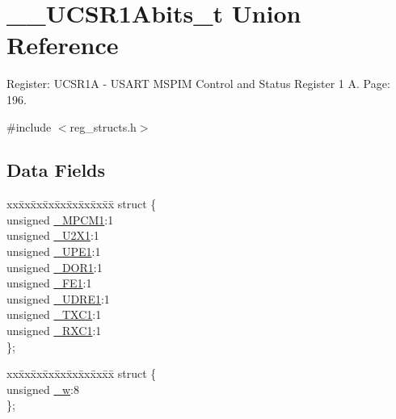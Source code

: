 \hypertarget{union_____u_c_s_r1_abits__t}{\section{\+\_\+\+\_\+\+U\+C\+S\+R1\+Abits\+\_\+t Union Reference}
\label{union_____u_c_s_r1_abits__t}
}


Register\+: U\+C\+S\+R1\+A -\/ U\+S\+A\+R\+T M\+S\+P\+I\+M Control and Status Register 1 A. Page\+: 196.  




{\ttfamily \#include $<$reg\+\_\+structs.\+h$>$}

\subsection*{Data Fields}
\begin{DoxyCompactItemize}
\item 
\begin{tabbing}
xx\=xx\=xx\=xx\=xx\=xx\=xx\=xx\=xx\=\kill
struct \{\\
\>unsigned \hyperlink{union_____u_c_s_r1_abits__t_ab7f184689175f44151a369c8e44ae3b1}{\_MPCM1}:1\\
\>unsigned \hyperlink{union_____u_c_s_r1_abits__t_ad2445ee4df3f594561e2160370aa2cf3}{\_U2X1}:1\\
\>unsigned \hyperlink{union_____u_c_s_r1_abits__t_af2de1f2c93bcaa75498d48a04040302c}{\_UPE1}:1\\
\>unsigned \hyperlink{union_____u_c_s_r1_abits__t_aee4899f794cda804485f4631d12bd220}{\_DOR1}:1\\
\>unsigned \hyperlink{union_____u_c_s_r1_abits__t_adc9cf635c2542d92e91c6647bea05c4c}{\_FE1}:1\\
\>unsigned \hyperlink{union_____u_c_s_r1_abits__t_a33d9b71b4098a3f014aae771b120b178}{\_UDRE1}:1\\
\>unsigned \hyperlink{union_____u_c_s_r1_abits__t_a9c421bf237d3202f597c6c9c5792d78b}{\_TXC1}:1\\
\>unsigned \hyperlink{union_____u_c_s_r1_abits__t_a730365a58a3ec5054ab414a485b0d2f1}{\_RXC1}:1\\
\}; \\

\end{tabbing}\item 
\begin{tabbing}
xx\=xx\=xx\=xx\=xx\=xx\=xx\=xx\=xx\=\kill
struct \{\\
\>unsigned \hyperlink{union_____u_c_s_r1_abits__t_adce88bf5075c4eed792643beac7a5ca0}{\_w}:8\\
\}; \\

\end{tabbing}\end{DoxyCompactItemize}


